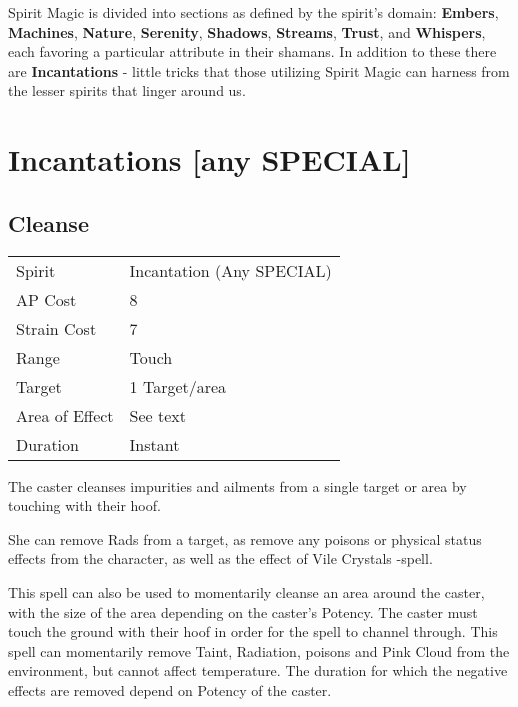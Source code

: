 \documentclass[11pt,a4paper,twocolumn]{book}
\begin{document}
Spirit Magic is divided into sections as defined by the spirit's domain: \textbf{Embers}, \textbf{Machines}, \textbf{Nature}, \textbf{Serenity}, \textbf{Shadows}, \textbf{Streams}, \textbf{Trust}, and \textbf{Whispers}, each favoring a particular attribute in their shamans. In addition to these there are \textbf{Incantations} - little tricks that those utilizing Spirit Magic can harness from the lesser spirits that linger around us.

\vfill

\section*{Incantations [any SPECIAL]}

\subsection*{Cleanse}
{
	\begin{tabu} to 75mm{| X[l,4] | X[l,7] |}
		\hline
		Spirit         & Incantation (Any SPECIAL) \\
		AP Cost        & 8                         \\
		Strain Cost    & 7                         \\
		Range          & Touch                     \\
		Target         & 1 Target/area             \\
		Area of Effect & See text                  \\
		Duration       & Instant                   \\ \hline
	\end{tabu}
	
}

\medskip

The caster cleanses impurities and ailments from a single target or area by touching with their hoof. 

She can remove Rads from a target, as remove any poisons or physical status effects from the character, as well as the effect of Vile Crystals -spell. 

This spell can also be used to momentarily cleanse an area around the caster, with the size of the area depending on the caster's Potency. The caster must touch the ground with their hoof in order for the spell to channel through. 
This spell can momentarily remove Taint, Radiation, poisons and Pink Cloud from the environment, but cannot affect temperature. The duration for which the negative effects are removed depend on Potency of the caster.
\end{document}
